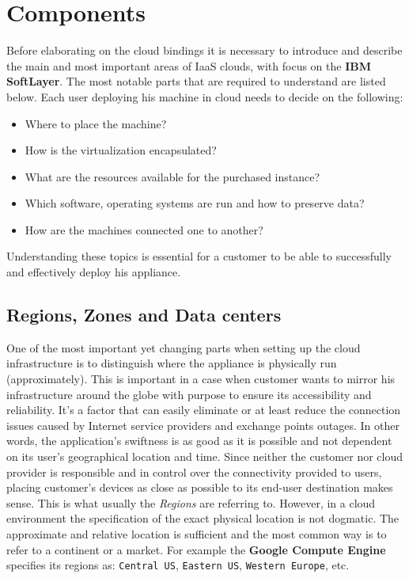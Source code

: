 \section{Components}
\label{sec:Components}

Before elaborating on the cloud bindings it is necessary to introduce and describe the main and most important areas of IaaS clouds, with focus on the \textbf{IBM SoftLayer}. The most notable parts that are required to understand are listed below. Each user deploying his machine in cloud needs to decide on the following:

\begin{itemize}
	\item Where to place the machine?
	\item How is the virtualization encapsulated?
	\item What are the resources available for the purchased instance?
	\item Which software, operating systems are run and how to preserve data?
	\item How are the machines connected one to another?
\end{itemize}

Understanding these topics is essential for a customer to be able to successfully and effectively deploy his appliance.

\subsection{Regions, Zones and Data centers}
\label{sub:Regions, Zones and Data centers}

One of the most important yet changing parts when setting up the cloud infrastructure is to distinguish where the appliance is physically run (approximately). This is important in a case when customer wants to mirror his infrastructure around the globe with purpose to ensure its accessibility and reliability. It's a factor that can easily eliminate or at least reduce the connection issues caused by Internet service providers and exchange points outages. In other words, the application's swiftness is as good as it is possible and not dependent on its user's geographical location and time. Since neither the customer nor cloud provider is responsible and in control over the connectivity provided to users, placing customer's devices as close as possible to its end-user destination makes sense. This is what usually the \emph{Regions} are referring to. However, in a cloud environment the specification of the exact physical location is not dogmatic. The approximate and relative location is sufficient and the most common way is to refer to a continent or a market. For example the \textbf{Google Compute Engine}~\cite{gce} specifies its regions as: \texttt{Central US}, \texttt{Eastern US}, \texttt{Western Europe}, etc.

